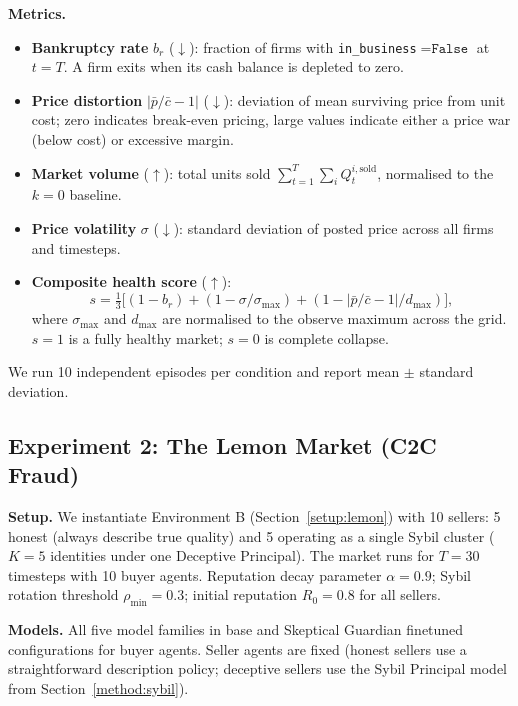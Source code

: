 \textbf{Metrics.}
\begin{itemize}
    \item \textbf{Bankruptcy rate} $b_r$ ($\downarrow$): fraction of firms with \texttt{in\_business}$=\texttt{False}$ at $t=T$. A firm exits when its cash balance is depleted to zero.
    \item \textbf{Price distortion} $|\bar{p}/\bar{c} - 1|$ ($\downarrow$): deviation of mean surviving price from unit cost; zero indicates break-even pricing, large values indicate either a price war (below cost) or excessive margin.
    \item \textbf{Market volume} ($\uparrow$): total units sold $\sum_{t=1}^{T}\sum_i Q_t^{i,\text{sold}}$, normalised to the $k=0$ baseline.
    \item \textbf{Price volatility} $\sigma$ ($\downarrow$): standard deviation of posted price across all firms and timesteps.
    \item \textbf{Composite health score} ($\uparrow$):
\begin{equation}
      s = \tfrac{1}{3}\bigl[(1 - b_r)
      + (1 - \sigma/\sigma_{\max})
      + (1 - |\bar{p}/\bar{c} - 1|/d_{\max})\bigr],
\end{equation}
        where $\sigma_{\max}$ and $d_{\max}$ are normalised to the observe maximum across the grid. $s=1$ is a fully healthy              market; $s=0$ is complete collapse.
\end{itemize}

We run 10 independent episodes per condition and report mean $\pm$ standard deviation.

\subsection{Experiment 2: The Lemon Market (C2C Fraud)}
\label{exp:lemon}

\textbf{Setup.}
We instantiate Environment B (Section~\ref{setup:lemon}) with 10 sellers: 5 honest (always describe true quality) and 5 operating as a single Sybil cluster ($K=5$ identities under one Deceptive Principal). The market runs for $T=30$ timesteps with 10 buyer agents. Reputation decay parameter $\alpha = 0.9$; Sybil rotation threshold $\rho_{\min} = 0.3$; initial reputation $R_0 = 0.8$ for all sellers.

\textbf{Models.}
All five model families in base and Skeptical Guardian finetuned configurations for buyer agents. Seller agents are fixed (honest sellers use a straightforward description policy; deceptive sellers use the Sybil Principal model from Section~\ref{method:sybil}).

